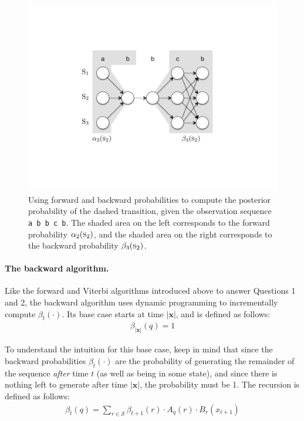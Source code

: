 \begin{figure}[t]
\begin{center}
\includegraphics[scale=0.6]{figures/fig-ch6-HMM-forward-backward.pdf}
\end{center}\caption{Using forward and backward probabilities to compute the posterior probability of the dashed transition, given the observation sequence {\texttt{ a b b c b}.  The shaded area on the left corresponds to the forward probability $\alpha_{2}(\textsc{s}_2)$, and the shaded area on the right corresponds to the backward probability $\beta_3(\textsc{s}_2)$.}\label{chapter6_forwardbackward}}
\end{figure}

\paragraph{\textbf{The backward algorithm.}}
Like the forward and Viterbi algorithms introduced above to answer
Questions 1 and 2, the backward algorithm uses dynamic programming to
incrementally compute $\beta_t(\cdot)$.  Its base case starts at time
$|\textbf{x}|$, and is defined as follows:
\label{chapter6_backward}
\begin{eqnarray}
\beta_{|\textbf{x}|}(q) = 1
\end{eqnarray}

\noindent To understand the intuition for this base case, keep in mind
that since the backward probabilities $\beta_t(\cdot)$ are the
probability of generating the remainder of the sequence \emph{after}
time $t$ (as well as being in some state), and since there is nothing
left to generate after time $|\textbf{x}|$, the probability must be 1.
The recursion is defined as follows:
\begin{eqnarray}
\beta_{t}(q) = \sum_{r \in \mathcal{S}} \beta_{t+1}(r) \cdot A_q(r) \cdot B_r(x_{t+1})
\end{eqnarray}

